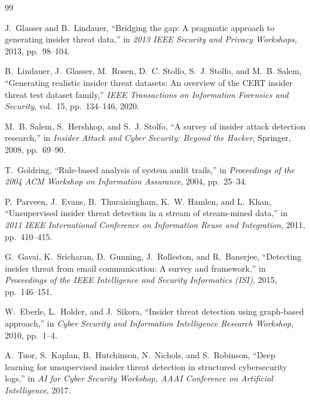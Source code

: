 \documentclass[12pt,a4paper]{report}
\begin{document}
\newpage
\begin{thebibliography}{99}

J.~Glasser and B.~Lindauer, ``Bridging the gap: A pragmatic approach to generating insider threat data,'' in \emph{2013 IEEE Security and Privacy Workshops}, 2013, pp.~98--104.

B.~Lindauer, J.~Glasser, M.~Rosen, D.~C. Stolfo, S.~J. Stolfo, and M.~B. Salem, ``Generating realistic insider threat datasets: An overview of the CERT insider threat test dataset family,'' \emph{IEEE Transactions on Information Forensics and Security}, vol.~15, pp.~134--146, 2020.

M.~B. Salem, S.~Hershkop, and S.~J. Stolfo, ``A survey of insider attack detection research,'' in \emph{Insider Attack and Cyber Security: Beyond the Hacker}, Springer, 2008, pp.~69--90.

T.~Goldring, ``Rule-based analysis of system audit trails,'' in \emph{Proceedings of the 2004 ACM Workshop on Information Assurance}, 2004, pp.~25--34.

P.~Parveen, J.~Evans, B.~Thuraisingham, K.~W. Hamlen, and L.~Khan, ``Unsupervised insider threat detection in a stream of stream-mined data,'' in \emph{2011 IEEE International Conference on Information Reuse and Integration}, 2011, pp.~410--415.

G.~Gavai, K.~Sricharan, D.~Gunning, J.~Rolleston, and R.~Banerjee, ``Detecting insider threat from email communication: A survey and framework,'' in \emph{Proceedings of the IEEE Intelligence and Security Informatics (ISI)}, 2015, pp.~146--151.

W.~Eberle, L.~Holder, and J.~Sikora, ``Insider threat detection using graph-based approach,'' in \emph{Cyber Security and Information Intelligence Research Workshop}, 2010, pp.~1--4.

A.~Tuor, S.~Kaplan, B.~Hutchinson, N.~Nichols, and S.~Robinson, ``Deep learning for unsupervised insider threat detection in structured cybersecurity logs,'' in \emph{AI for Cyber Security Workshop, AAAI Conference on Artificial Intelligence}, 2017.


\end{thebibliography}
\end{document}
